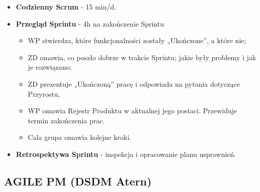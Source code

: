 \documentclass[a4paper]{article}
\begin{document}
\begin{itemize}
\begin{itemize}
            \item \textbf{Codzienny Scrum} - 15 min/d.

            \item \textbf{Przegląd Sprintu} - 4h na zakończenie Sprintu
            \begin{itemize}
                \item WP stwierdza, które funkcjonalności zostały „Ukończone”, a które nie;
                \item ZD omawia, co poszło dobrze w trakcie Sprintu; jakie były problemy i jak je rozwiązano;
                \item ZD prezentuje „Ukończoną” pracę i odpowiada na pytania dotyczące Przyrostu,
                \item WP omawia Rejestr Produktu w aktualnej jego postaci. Przewiduje termin zakończenia prac.
                \item Cala grupa omawia kolejne kroki.
            \end{itemize}

            \item \textbf{Retrospektywa Sprintu} - inspekcja i opracowanie planu usprawnień.
        \end{itemize}

    \end{itemize}

    \subsection{AGILE PM (DSDM Atern)}
\end{document}
